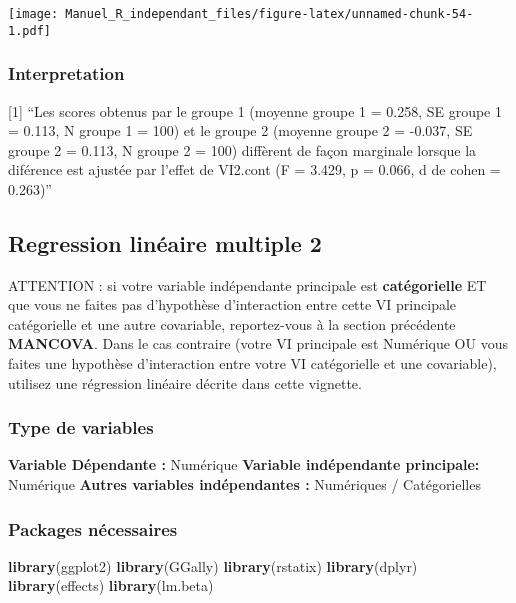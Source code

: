 \documentclass[
]{book}
\newenvironment{Shaded}{\begin{snugshade}}{\end{snugshade}}
\newcommand{\KeywordTok}[1]{\textcolor[rgb]{0.13,0.29,0.53}{\textbf{#1}}}
\newcommand{\NormalTok}[1]{#1}
\begin{document}
\texttt{[image: Manuel\_R\_independant\_files/figure-latex/unnamed-chunk-54-1.pdf]}

\hypertarget{interpretation-5}{%
\subsubsection{Interpretation}\label{interpretation-5}}

{[}1{]} ``Les scores obtenus par le groupe 1 (moyenne groupe 1 = 0.258, SE groupe 1 = 0.113, N groupe 1 = 100) et le groupe 2 (moyenne groupe 2 = -0.037, SE groupe 2 = 0.113, N groupe 2 = 100) diffèrent de façon marginale lorsque la diférence est ajustée par l'effet de VI2.cont (F = 3.429, p = 0.066, d de cohen = 0.263)''

\hypertarget{regression-linuxe9aire-multiple-2}{%
\subsection{Regression linéaire multiple 2}\label{regression-linuxe9aire-multiple-2}}

ATTENTION : si votre variable indépendante principale est \textbf{catégorielle} ET que vous ne faites pas d'hypothèse d'interaction entre cette VI principale catégorielle et une autre covariable, reportez-vous à la section précédente \textbf{MANCOVA}.
Dans le cas contraire (votre VI principale est Numérique OU vous faites une hypothèse d'interaction entre votre VI catégorielle et une covariable), utilisez une régression linéaire décrite dans cette vignette.

\hypertarget{type-de-variables-6}{%
\subsubsection{Type de variables}\label{type-de-variables-6}}

\textbf{Variable Dépendante :} Numérique
\textbf{Variable indépendante principale:} Numérique
\textbf{Autres variables indépendantes :} Numériques / Catégorielles

\hypertarget{packages-nuxe9cessaires-6}{%
\subsubsection{Packages nécessaires}\label{packages-nuxe9cessaires-6}}

\begin{Shaded}
\begin{Highlighting}[]
\KeywordTok{library}\NormalTok{(ggplot2)}
\KeywordTok{library}\NormalTok{(GGally)}
\KeywordTok{library}\NormalTok{(rstatix)}
\KeywordTok{library}\NormalTok{(dplyr)}
\KeywordTok{library}\NormalTok{(effects)}
\KeywordTok{library}\NormalTok{(lm.beta)}
\end{Highlighting}
\end{Shaded}
\end{document}
